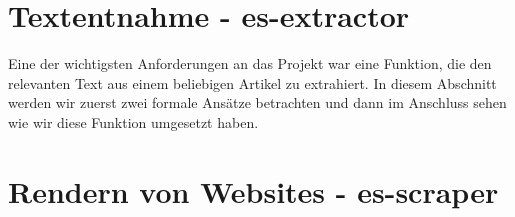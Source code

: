 

\chapter{Textentnahme - es-extractor}

Eine der wichtigsten Anforderungen an das Projekt war eine Funktion, die den relevanten Text aus einem beliebigen Artikel zu extrahiert. In diesem Abschnitt werden wir zuerst zwei formale Ansätze betrachten und dann im Anschluss sehen wie wir diese Funktion umgesetzt haben.




\chapter{Rendern von Websites - es-scraper}

